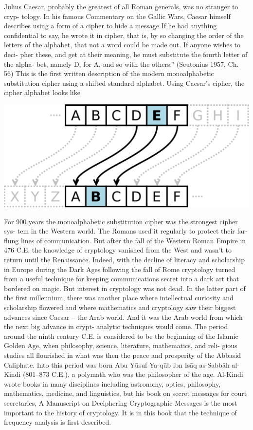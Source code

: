 \documentclass{report}
\begin{document}
{{{Julius Caesar, probably the greatest of all Roman generals, was no stranger to cryp-
tology. In his famous Commentary on the Gallic Wars, Caesar himself describes
using a form of a cipher to hide a message If he had anything confidential to say, he wrote it in cipher, that is, by so changing the order of the
letters of the alphabet, that not a word could be made out. If anyone wishes to deci-
pher these, and get at their meaning, he must substitute the fourth letter of the alpha-
bet, namely D, for A, and so with the others.” (Seutonius 1957, Ch. 56) This is the
first written description of the modern monoalphabetic substitution cipher using a
shifted standard alphabet. Using Caesar’s cipher, the cipher alphabet looks like}

\begin{center}
\includegraphics[scale=0.3]{"ceser.png"}
\end{center}

\Large{For 900 years the monoalphabetic substitution cipher was the strongest cipher sys-
tem in the Western world. The Romans used it regularly to protect their far-flung
lines of communication. But after the fall of the Western Roman Empire in 476 C.E.
the knowledge of cryptology vanished from the West and wasn’t to return until the
Renaissance. Indeed, with the decline of literacy and scholarship in Europe during
the Dark Ages following the fall of Rome cryptology turned from a useful technique
for keeping communications secret into a dark art that bordered on magic.
But interest in cryptology was not dead. In the latter part of the first millennium,
there was another place where intellectual curiosity and scholarship flowered and
where mathematics and cryptology saw their biggest advances since Caesar – the
Arab world. And it was the Arab world from which the next big advance in crypt-
analytic techniques would come.
The period around the ninth century C.E. is considered to be the beginning of the
Islamic Golden Age, when philosophy, science, literature, mathematics, and reli-
gious studies all flourished in what was then the peace and prosperity of the Abbasid
Caliphate. Into this period was born Abu Yūsuf Ya-qūb ibn Isāq as-Sabbāh al-Kindi
(801–873 C.E.), a polymath who was the philosopher of the age. Al-Kindi wrote
books in many disciplines including astronomy, optics, philosophy, mathematics,
medicine, and linguistics, but his book on secret messages for court secretaries, A
Manuscript on Deciphering Cryptographic Messages is the most important to the
history of cryptology. It is in this book that the technique of frequency analysis is
first described.}

}}
\end{document}
